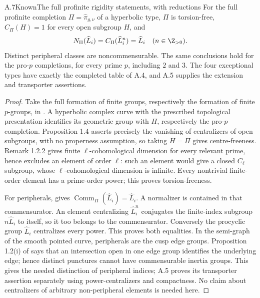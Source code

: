\begin{claim}{A.7}{Known}{The full profinite rigidity statements, with reductions}
For the full profinite completion $\Pi=\widehat\pi_{g,\nu}$ of a hyperbolic type, $\Pi$ is torsion-free, $C_\Pi(H)=1$ for every open subgroup $H$, and
\[
N_\Pi(\widehat L_i)=C_\Pi(\widehat L_i^n)=\widehat L_i
\quad(n\in\Z_{>0}).
\]
Distinct peripheral classes are noncommensurable. The same conclusions hold for the pro-$p$ completions, for every prime $p$, including $2$ and $3$. The four exceptional types have exactly the completed table of A.4, and A.5 supplies the extension and transporter assertions.
\end{claim}
\begin{proof}
Take the full formation of finite groups, respectively the formation of finite $p$-groups, in \cite[Remark 1.2.2 and Proposition 1.4]{A_MochizukiTamagawa2008}. A hyperbolic complex curve with the prescribed topological presentation identifies its geometric group with $\Pi$, respectively the pro-$p$ completion. Proposition 1.4 asserts precisely the vanishing of centralizers of open subgroups, with no properness assumption, so taking $H=\Pi$ gives centre-freeness. Remark 1.2.2 gives finite $\ell$-cohomological dimension for every relevant prime, hence excludes an element of order $\ell$: such an element would give a closed $C_\ell$ subgroup, whose $\ell$-cohomological dimension is infinite. Every nontrivial finite-order element has a prime-order power; this proves torsion-freeness.

For peripherals, \cite[Lemma 1.3.7]{A_Mochizuki2004} gives $\operatorname{Comm}_\Pi(\widehat L_i)=\widehat L_i$. A normalizer is contained in that commensurator. An element centralizing $\widehat L_i^n$ conjugates the finite-index subgroup $n\widehat L_i$ to itself, so it too belongs to the commensurator. Conversely the procyclic group $\widehat L_i$ centralizes every power. This proves both equalities. In the semi-graph of the smooth pointed curve, peripherals are the cusp edge groups. Proposition 1.2(i) of \cite{A_Mochizuki2007} says that an intersection open in one edge group identifies the underlying edge; hence distinct punctures cannot have commensurable inertia groups. This gives the needed distinction of peripheral indices; A.5 proves its transporter assertion separately using power-centralizers and compactness. No claim about centralizers of arbitrary non-peripheral elements is needed here.


\end{proof}
